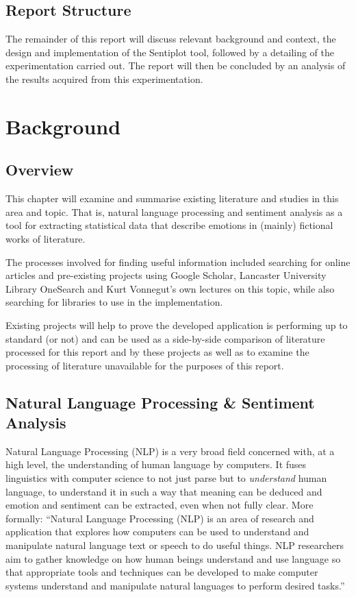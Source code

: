\documentclass{article}
\begin{document}
{    \subsection{Report Structure}
        The remainder of this report will discuss relevant background and context, the design and implementation of the Sentiplot tool, followed by a detailing of the experimentation carried out. The report will then be concluded by an analysis of the results acquired from this experimentation. 
\newpage
\section{Background}
\label{sec:background)}
    \subsection{Overview}
        This chapter will examine and summarise existing literature and studies in this area and topic. That is, natural language processing and sentiment analysis as a tool for extracting statistical data that describe emotions in (mainly) fictional works of literature.

        The processes involved for finding useful information included searching for online articles and pre-existing projects using Google Scholar, Lancaster University Library OneSearch and Kurt Vonnegut’s own lectures on this topic, while also searching for libraries to use in the implementation.

        Existing projects will help to prove the developed application is performing up to standard (or not) and can be used as a side-by-side comparison of literature processed for this report and by these projects as well as to examine the processing of literature unavailable for the purposes of this report.
    \subsection{Natural Language Processing \& Sentiment Analysis}
        Natural Language Processing (NLP) is a very broad field concerned with, at a high level, the understanding of human language by computers. It fuses linguistics with computer science to not just parse but to \textit{understand} human language, to understand it in such a way that meaning can be deduced and emotion and sentiment can be extracted, even when not fully clear. More formally: ``Natural Language Processing (NLP) is an area of research and application that explores how computers can be used to understand and manipulate natural language text or speech to do useful things. NLP researchers aim to gather knowledge on how human beings understand and use language so that appropriate tools and techniques can be developed to make computer systems understand and manipulate natural languages to perform desired tasks.'' \citep{chowdhury2003natural}

}
\end{document}
